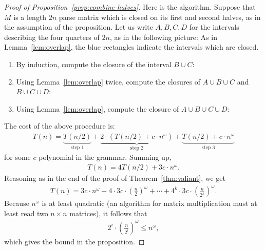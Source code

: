\begin{proof}[Proof of Proposition~\ref{prop:combine-halves}]
	Here is the algorithm. Suppose that $M$ is a length $2n$ parse matrix which is closed on its first and second halves, as in the assumption of the proposition. Let us write $A,B,C,D$ for the intervals describing the four quarters of $2n$, as in the following picture: 
As in Lemma~\ref{lem:overlap},	the blue rectangles indicate the intervals which are closed. 
	\begin{enumerate}
	\item By induction,  compute the closure of the interval $B \cup C$:
		\item 	Using Lemma~\ref{lem:overlap} twice,   compute the closures of $A \cup B \cup C$ and  $B \cup C \cup D$:
		\item Using Lemma~\ref{lem:overlap}, compute the closure of $A \cup B \cup C \cup D$:
	\end{enumerate}
The cost of the above procedure is:
\begin{align*}
  T(n) = \underbrace{T(n/2)}_{\text{step 1}} +  \underbrace{2 \cdot (T(n/2) + c \cdot n^\omega)}_{\text{step 2}} + \underbrace{T(n/2) +  c \cdot n^\omega}_{\text{step 3}} 
\end{align*}
for some $c$ polynomial in the grammar. Summing up,
\begin{align*}
T(n) =   4T(n/2) + 3c \cdot n^\omega.
\end{align*}
Reasoning as in the end of the proof of Theorem~\ref{thm:valiant}, we get
\begin{align*}
  T(n) = 3c \cdot n^\omega + 4 \cdot 3c \cdot (\frac n 2)^\omega + \cdots + 4^k \cdot 3c \cdot (\frac n {2^k})^\omega.
\end{align*}	
Because $n^\omega$ is at least quadratic (an algorithm for matrix multiplication must at least read two  $n \times n$ matrices), it follows that 
\begin{align*}
  2^i  \cdot (\frac n {2^i})^\omega \le     n^\omega,
\end{align*}
which gives the bound in the proposition.
\end{proof}

